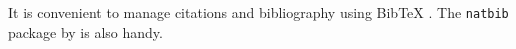 \documentclass{article}
\begin{document}
 It is convenient to manage citations and bibliography using BibTeX \citep{fenn2006managing}. The \texttt{natbib} package by \citet{daly2010natbib} is also handy.
 
\end{document}
